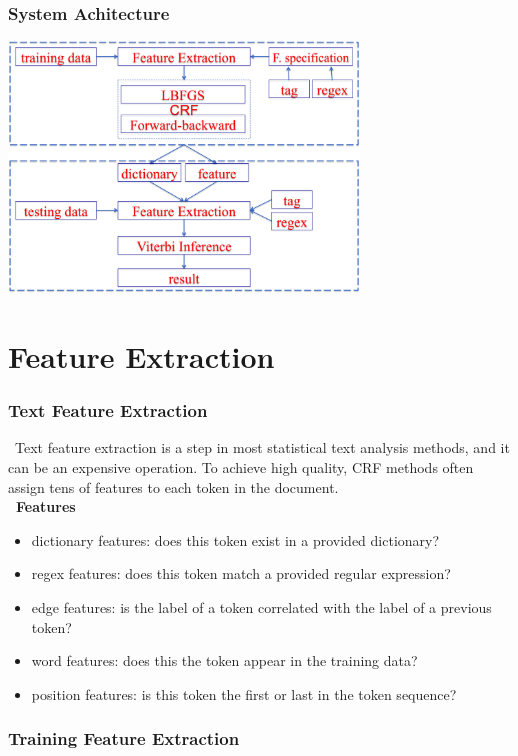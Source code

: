 \documentclass{beamer}
\begin{document}
\begin{frame}
  \frametitle{System Achitecture}
  \begin{center}
  \includegraphics[height=18em]{system.png}
  \end{center}
\end{frame}


\section{Feature Extraction}
\begin{frame}
  \frametitle{Text Feature Extraction}
   \ Text feature extraction is a step in most statistical text analysis methods, and it can be an expensive operation. 
     To achieve high quality, CRF methods often assign tens of features to each token in the document. \\[1.5mm] 
     \textbf{\ Features}\vspace{-1.5mm}
     \begin{itemize}
      \item dictionary features: does this token exist in a provided dictionary? 
      \item regex features: does this token match a provided regular expression? 
      \item edge features: is the label of a token correlated with the label of a previous token? 
      \item word features: does this the token appear in the training data? 
      \item position features: is this token the first or last in the token sequence? 
     \end{itemize}
\end{frame}

\begin{frame}
  \frametitle{Training Feature Extraction}
\end{frame}
\end{document}
